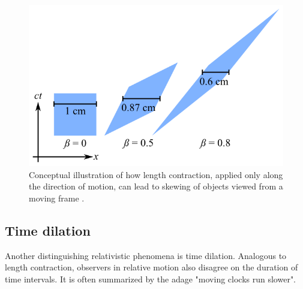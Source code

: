 \documentclass[a4paper]{article}
\begin{document}
\begin{figure}
    \centering
    \includegraphics[width=0.5\linewidth]{img/skewing.png}
    \caption{Conceptual illustration of how length contraction, applied only along the direction of motion, can lead to skewing of objects viewed from a moving frame \cite{skew}.}
    \label{fig:skewing}
\end{figure}




\subsection{Time dilation}
Another distinguishing relativistic phenomena is time dilation. Analogous to length contraction, observers in relative motion also disagree on the duration of time intervals. It is often summarized by the adage "moving clocks run slower".
\end{document}
